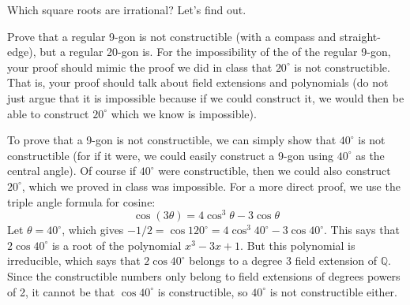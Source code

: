 \documentclass[11pt]{exam}
\def\Z{\mathbb{Z}}
\def\Q{\mathbb{Q}}
\begin{document}
\begin{questions}
\question[6] Which square roots are irrational?  Let's find out. 


\question[6] Prove that a regular 9-gon is not constructible (with a compass and straight-edge), but a regular 20-gon is.  For the impossibility of the of the regular 9-gon, your proof should mimic the proof we did in class that $20^\circ$ is not constructible.  That is, your proof should talk about field extensions and polynomials (do not just argue that it is impossible because if we could construct it, we would then be able to construct $20^\circ$ which we know is impossible).

\begin{solution}
To prove that a 9-gon is not constructible, we can simply show that $40^{\circ}$ is not constructible (for if it were, we could easily construct a 9-gon using $40^{\circ}$ as the central angle).  Of course if $40^{\circ}$ were constructible, then we could also construct $20^{\circ}$, which we proved in class was impossible.  For a more direct proof, we use the triple angle formula for cosine:
\[\cos(3\theta) = 4\cos^3\theta - 3\cos\theta\]
Let $\theta = 40^{\circ}$, which gives $-1/2 = \cos 120^{\circ} = 4 \cos^3 40^{\circ} - 3 \cos 40^{\circ}$.  This says that $2 \cos 40^{\circ}$ is a root of the polynomial $x^3 - 3x + 1$.  But this polynomial is irreducible, which says that $2 \cos 40^{\circ}$ belongs to a degree $3$ field extension of $\Q$.  Since the constructible numbers only belong to field extensions of degrees powers of 2, it cannot be that $\cos 40^{\circ}$ is constructible, so $40^{\circ}$ is not constructible either.


\end{solution}
\end{questions}
\end{document}
